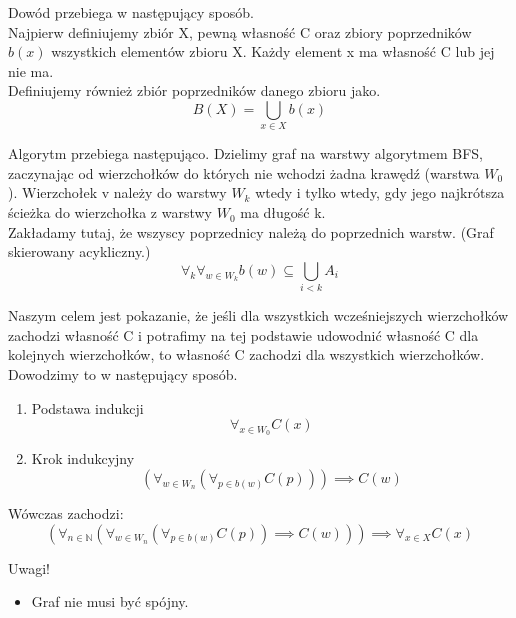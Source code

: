 \documentclass[paper=a4, fontsize=11pt]{article}
\begin{document}
\begin{mydef} 
Dowód przebiega w następujący sposób.\\ 

Najpierw definiujemy zbiór X, pewną własność C oraz zbiory poprzedników $b(x)$ wszystkich elementów zbioru X. Każdy element x ma własność C lub jej nie ma.\\

Definiujemy również zbiór poprzedników danego zbioru jako.
\begin{displaymath}
B(X) = \bigcup_{x \in X} b(x)
\end{displaymath}

Algorytm przebiega następująco. Dzielimy graf na warstwy algorytmem BFS, zaczynając od wierzchołków do których nie wchodzi żadna krawędź (warstwa $W_0$). Wierzchołek v należy do warstwy $W_k$ wtedy i tylko wtedy, gdy jego najkrótsza ścieżka do wierzchołka z warstwy $W_0$ ma długość k. \\

Zakładamy tutaj, że wszyscy poprzednicy należą do poprzednich warstw. (Graf skierowany acykliczny.)
\begin{displaymath}
\forall_k \forall_{w \in W_k} b(w) \subseteq \bigcup_{i < k} A_i
\end{displaymath}

Naszym celem jest pokazanie, że jeśli dla wszystkich wcześniejszych wierzchołków zachodzi własność C i potrafimy na tej podstawie udowodnić własność C dla kolejnych wierzchołków, to własność C zachodzi dla wszystkich wierzchołków.
Dowodzimy to w następujący sposób.


\begin{enumerate}
\item Podstawa indukcji
\begin{displaymath}
\forall_{x \in W_{0}} C(x)
\end{displaymath} 
\item Krok indukcyjny
\begin{displaymath}
(\forall_{w \in W_n} (\forall_{p \in b(w)} C(p))) \implies C(w)
\end{displaymath}
\end{enumerate}

Wówczas zachodzi:
\begin{displaymath}
(\forall_{n \in \mathbb{N}}( \forall_{w \in W_n} (\forall_{p \in b(w)} C(p)) \implies C(w))) \implies \forall_{x \in X} C(x)
\end{displaymath}

Uwagi!
\begin{itemize}
\item Graf nie musi być spójny.
\end{itemize}
\end{mydef}
\end{document}
